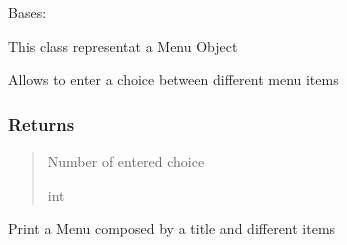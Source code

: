 \documentclass[letterpaper,10pt,english]{sphinxmanual}
\begin{document}
\begin{fulllineitems}
\label{\detokenize{api_reference/utility/menu:menu.Menu}}
\pysigstartsignatures
{}
\pysigstopsignatures
\sphinxAtStartPar
Bases: 

\sphinxAtStartPar
This class representat a Menu Object

\begin{fulllineitems}
\label{\detokenize{api_reference/utility/menu:menu.Menu.choose}}
\pysigstartsignatures
{}
\pysigstopsignatures
\sphinxAtStartPar
Allows to enter a choice between different menu items


\subsubsection{Returns}
\label{\detokenize{api_reference/utility/menu:returns}}\begin{quote}\begin{description}
\sphinxAtStartPar
Number of entered choice

\sphinxAtStartPar
int

\end{description}\end{quote}

\end{fulllineitems}


\begin{fulllineitems}
\label{\detokenize{api_reference/utility/menu:menu.Menu.print_menu}}
\pysigstartsignatures
{}
\pysigstopsignatures
\sphinxAtStartPar
Print a Menu composed by a title and different items

\end{fulllineitems}


\end{fulllineitems}


\sphinxstepscope
\end{document}
